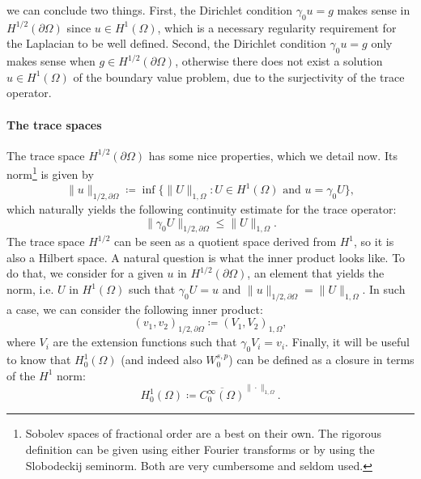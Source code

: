 we can conclude two things. First, the Dirichlet condition $\gamma_0 u = g$ makes sense in $H^{1/2}(\partial\Omega)$ since $u\in H^1(\Omega)$, which is a necessary regularity requirement for the Laplacian to be well defined. Second, the Dirichlet condition $\gamma_0 u = g$ only makes sense when $g\in H^{1/2}(\partial\Omega)$, otherwise there does not exist a solution $u\in H^1(\Omega)$ of the boundary value problem, due to the surjectivity of the trace operator. %
\paragraph{The trace spaces} The trace space $H^{1/2}(\partial\Omega)$ has some nice properties, which we detail now. Its norm\footnote{Sobolev spaces of fractional order are a best on their own. The rigorous definition can be given using either Fourier transforms or by using the Slobodeckij seminorm. Both are very cumbersome and seldom used.} is given by 
\begin{equation}\label{eq:norm-trace-1/2}
    \| u \|_{1/2,\partial\Omega} \coloneqq \inf\{\|U\|_{1,\Omega}: U \in H^1(\Omega) \text{ and } u = \gamma_0 U\},
\end{equation}
which naturally yields the following continuity estimate for the trace operator: 
\begin{equation}
    \| \gamma_0 U\|_{1/2,\partial\Omega} \leq \| U \|_{1,\Omega} .
\end{equation}
The trace space $H^{1/2}$ can be seen as a quotient space derived from $H^1$, so it is also a Hilbert space. A natural question is what the inner product looks like. To do that, we consider for a given $u$ in $H^{1/2}(\partial\Omega)$, an element that yields the norm, i.e. $U$ in $H^1(\Omega)$ such that $\gamma_0 U = u$ and $\| u \|_{1/2,\partial\Omega} = \| U \|_{1,\Omega}$. In such a case, we can consider the following inner product: 
\begin{equation}\label{eq:inner-product-trace-1/2}
    (v_1, v_2)_{1/2,\partial\Omega} \coloneqq (V_1, V_2)_{1,\Omega},
\end{equation}
where $V_i$ are the extension functions such that $\gamma_0 V_i = v_i$. Finally, it will be useful to know that $H_0^1(\Omega)$ (and indeed also $W_0^{s,p}$) can be defined as a closure in terms of the $H^1$ norm: 
\begin{equation}\label{eq:def-H01-closure}
    H_0^1(\Omega) \coloneqq \overline{C_0^\infty(\Omega)}^{\|\cdot \|_{1,\Omega}}.
\end{equation}
